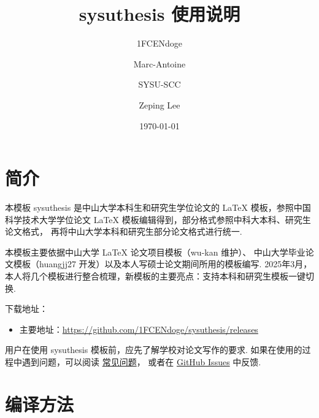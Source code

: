 \documentclass[a4paper]{ltxdoc}
\DeclareRobustCommand\pkg{\textsf}
\DeclareRobustCommand\cls{\textsf}
\begin{document}
\title{\cls{sysuthesis} 使用说明}
\author{1FCENdoge\footnotemark[1] \and Marc-Antoine\footnotemark[1] \and SYSU-SCC\footnotemark[3] \and Zeping Lee\footnotemark[2]}
\renewcommand{\thefootnote}{\fnsymbol{footnote}}
\date{\today}
\maketitle



\section{简介}

本模板 \cls{sysuthesis} 是中山大学本科生和研究生学位论文的 \LaTeX{}
模板，参照中国科学技术大学学位论文 \LaTeX{}
模板编辑得到，部分格式参照中科大本科、研究生论文格式，
再将中山大学本科和研究生部分论文格式进行统一.

本模板主要依据中山大学 \LaTeX{} 论文项目模板（wu-kan 维护）、
中山大学毕业论文模板（huangjj27 开发）以及本人写硕士论文期间所用的模板编写.
2025年3月，本人将几个模板进行整合梳理，新模板的主要亮点：支持本科和研究生模板一键切换.

下载地址：
\begin{itemize}
  \item 主要地址：\url{https://github.com/1FCENdoge/sysuthesis/releases}
\end{itemize}

用户在使用 \pkg{sysuthesis} 模板前，应先了解学校对论文写作的要求.
如果在使用的过程中遇到问题，可以阅读
\href{https://github.com/ustctug/ustcthesis/wiki}{常见问题}，
或者在 \href{https://github.com/1FCENdoge/sysuthesis/issues}{GitHub Issues}
中反馈.



\section{编译方法}
\end{document}
